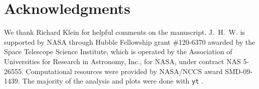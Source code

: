 \documentclass[useAMS,usenatbib]{mn2e}
\begin{document}
\section*{Acknowledgments}

We thank Richard Klein for helpful comments on the manuscript.
J.~H.~W. is supported by NASA through Hubble Fellowship grant
\#120-6370 awarded by the Space Telescope Science Institute, which is
operated by the Association of Universities for Research in Astronomy,
Inc., for NASA, under contract NAS 5-26555.  Computational resources
were provided by NASA/NCCS award SMD-09-1439.  The majority of the
analysis and plots were done with \texttt{yt} \citep{yt_full_paper}.



\bsp

\label{lastpage}
\end{document}
